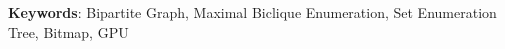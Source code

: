 
\vspace{\baselineskip}

\noindent \textbf{Keywords}: Bipartite Graph, Maximal Biclique Enumeration, Set Enumeration Tree, Bitmap, GPU